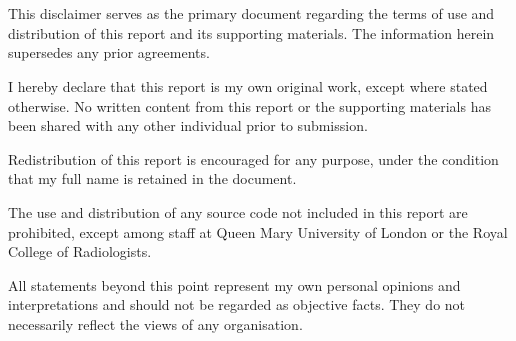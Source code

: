 \section*{}
\vspace{10pt}

This disclaimer serves as the primary document regarding the terms of use and distribution of this report and its supporting materials. The information herein supersedes any prior agreements.

I hereby declare that this report is my own original work, except where stated otherwise. No written content from this report or the supporting materials has been shared with any other individual prior to submission.

Redistribution of this report is encouraged for any purpose, under the condition that my full name is retained in the document.

The use and distribution of any source code not included in this report are prohibited, except among staff at Queen Mary University of London or the Royal College of Radiologists.

All statements beyond this point represent my own personal opinions and interpretations and should not be regarded as objective facts. They do not necessarily reflect the views of any organisation.
